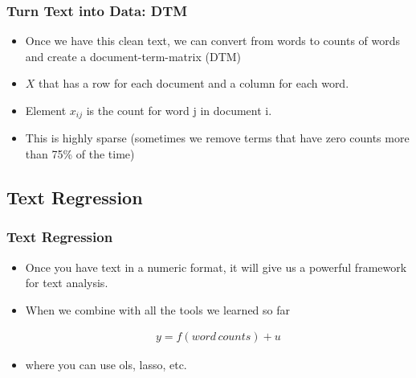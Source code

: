 \documentclass[
  shownotes,
  xcolor={svgnames},
  hyperref={colorlinks,citecolor=DarkBlue,linkcolor=DarkRed,urlcolor=DarkBlue}
  , aspectratio=169]{beamer}
\begin{document}
\begin{frame}[fragile]
\frametitle{Turn Text into Data: DTM}

\begin{itemize}
\item Once we have this clean text, we can convert from words to counts of words and create a document-term-matrix (DTM)
\medskip
\item $X$ that has a row for each document and a column for each word. 
\medskip
\item Element $x_{ij}$ is the count for word j in document i.
\medskip
\item This is highly sparse (sometimes we remove terms that have zero counts more than 75\% of the time)
\end{itemize}
\end{frame}
\subsection{Text Regression}
\begin{frame}
\frametitle{Text Regression}

\begin{itemize}
\item Once you have text in a numeric format, it will give us a powerful framework for text analysis.
\item When we combine with all the tools we learned so far



\medskip
\begin{align}
y= f(word\,counts) + u
\end{align}
 
\item where you can use ols, lasso, etc.

\end{itemize}
\end{frame}
\end{document}
